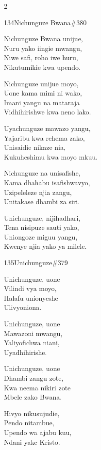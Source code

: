 \begin{multicols}{2}
\begin{hymn}{134}{Nichunguze Bwana}{\#380}
\begin{stanza}
Nichunguze Bwana unijue,\\
Nuru yako iingie mwangu,\\
Niwe safi, roho iwe huru,\\
Nikutumikie kwa upendo.
\end{stanza}
\begin{stanza}
Nichunguze unijue moyo,\\
Uone kama mimi ni wako,\\
Imani yangu na mataraja\\
Vidhihirishwe kwa neno lako.
\end{stanza}
\begin{stanza}
Uyachunguze mawazo yangu,\\
Yajaribu kwa rehema zako,\\
Unisaidie nikaze nia,\\
Kukuheshimu kwa moyo mkuu.
\end{stanza}
\begin{stanza}
Nichunguze na unisafishe,\\
Kama dhahabu isafishwavyo,\\
Uzipeleleze njia zangu,\\
Unitakase dhambi za siri.
\end{stanza}
\begin{stanza}
Unichunguze, nijihadhari,\\
Tena nisipuze sauti yako,\\
Uniongoze miguu yangu,\\
Kwenye njia yako ya milele.
\end{stanza}
\end{hymn}

\begin{hymn}{135}{Unichunguze}{\#379}
\begin{stanza}
Unichunguze, uone\\
Vilindi vya moyo,\\
Halafu unionyeshe\\
Ulivyoniona.
\end{stanza}
\begin{stanza}
Unichunguze, uone\\
Mawazoni mwangu,\\
Yaliyofichwa niani,\\
Uyadhihirishe.
\end{stanza}
\begin{stanza}
Unichunguze, uone\\
Dhambi zangu zote,\\
Kwa neema nikiri zote\\
Mbele zako Bwana.
\end{stanza}
\begin{stanza}
Hivyo nikusujudie,\\
Pendo nitambue,\\
Upendo wa ajabu kuu,\\
Ndani yake Kristo.
\end{stanza}
\end{hymn}


\end{multicols}
